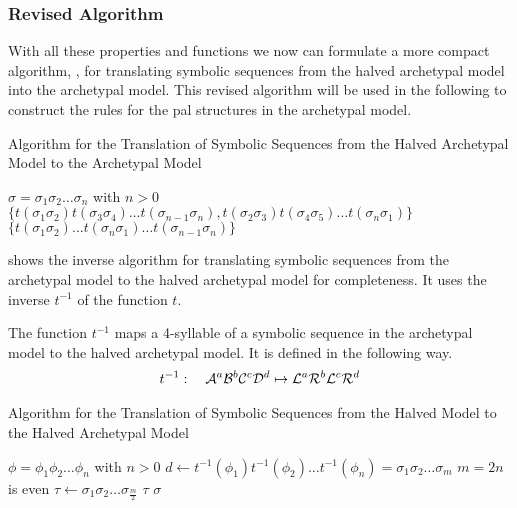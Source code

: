 \subsubsection{Revised Algorithm}

With all these properties and functions we now can formulate a more compact algorithm, , for translating symbolic sequences from the halved archetypal model into the archetypal model.
This revised algorithm will be used in the following to construct the rules for the \gls{pal} structures in the archetypal model.

\begin{algorithm}
	\caption{Algorithm for the Translation of Symbolic Sequences from the Halved Archetypal Model to the Archetypal Model}\label{alg:halved.to.full}
	\begin{algorithmic}
		\Require $\sigma = \sigma_1\sigma_2 \dots \sigma_n$ with $n > 0$
		\State \Return $\{t(\sigma_1\sigma_2) t(\sigma_3\sigma_4) \dots t(\sigma_{n-1}\sigma_n), t(\sigma_2\sigma_3) t(\sigma_4\sigma_5) \dots t(\sigma_n\sigma_1)\}$
		\State \Return $\{t(\sigma_1\sigma_2) \dots t(\sigma_{n}\sigma_1) \dots t(\sigma_{n-1}\sigma_n)\}$
		\EndIf
	\end{algorithmic}
\end{algorithm}

 shows the inverse algorithm for translating symbolic sequences from the archetypal model to the halved archetypal model for completeness.
It uses the inverse $t^{-1}$ of the function $t$.

\begin{definition}
	The function $t^{-1}$ maps a 4-syllable of a symbolic sequence in the archetypal model to the halved archetypal model.
	It is defined in the following way.
	\begin{align}
		t^{-1}: \quad \mathcal{A}^a\mathcal{B}^b\mathcal{C}^c\mathcal{D}^d \mapsto \mathcal{L}^a\mathcal{R}^b\mathcal{L}^c\mathcal{R}^d
	\end{align}
\end{definition}

\begin{algorithm}
	\caption{Algorithm for the Translation of Symbolic Sequences from the Halved Model to the Halved Archetypal Model}\label{alg:full.to.halved}
	\begin{algorithmic}
		\Require $\phi = \phi_1\phi_2 \dots \phi_n$ with $n > 0$
		\State $d \gets t^{-1}(\phi_1)t^{-1}(\phi_2) \dots t^{-1}(\phi_n) = \sigma_1\sigma_2 \dots \sigma_m$
		\Comment $m = 2n$ is even
		\State $\tau \gets \sigma_1\sigma_2 \dots \sigma_{\frac{m}{2}}$
		\If{$\sigma = \tau^2$}
		\State \Return $\tau$
		\ElsIf{$\sigma \neq \tau^2$}
		\State \Return $\sigma$
		\EndIf
	\end{algorithmic}
\end{algorithm}

